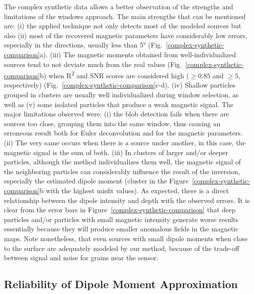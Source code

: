 The complex synthetic data allows a better observation of the strengths and limitations of the windows approach. The main strengths that can be mentioned are: (i) the applied technique not only detects most of the modeled sources but also (ii) most of the recovered magnetic parameters have considerably low errors, especially in the directions, usually less than 5° (Fig.~\ref{complex-synthetic-comparison}a). (iii) The magnetic moments obtained from well-individualized sources tend to not deviate much from the real values (Fig.~\ref{complex-synthetic-comparison}b) when R\textsuperscript{2} and SNR scores are considered high ($\geq 0.85$ and $\geq 5$, respectively) (Fig.~\ref{complex-synthetic-comparison}c-d). (iv) Shallow particles grouped in clusters are usually well individualized during window selection, as well as (v) some isolated particles that produce a weak magnetic signal. The major limitations observed were: (i) the blob detection fails when there are sources too close, grouping them into the same window, thus causing an erroneous result both for Euler deconvolution and for the magnetic parameters. (ii) The very same occurs when there is a source under another, in this case, the magnetic signal is the sum of both. (iii) In clusters of larger and/or deeper particles, although the method individualizes them well, the magnetic signal of the neighboring particles can considerably influence the result of the inversion, especially the estimated dipole moment (cluster in the Figure~\ref{complex-synthetic-comparison}b with the highest misfit values). As expected, there is a direct relationship between the dipole intensity and depth with the observed errors. It is clear from the error bars in Figure~\ref{complex-synthetic-comparison} that deep particles and/or particles with small magnetic intensity generate worse results essentially because they will produce smaller anomalous fields in the magnetic maps. Note nonetheless, that even sources with small dipole moments when close to the surface are adequately modeled by our method, because of the trade-off between signal and noise for grains near the sensor.



\subsection{Reliability of Dipole Moment Approximation}\label{dipole-reliability}

